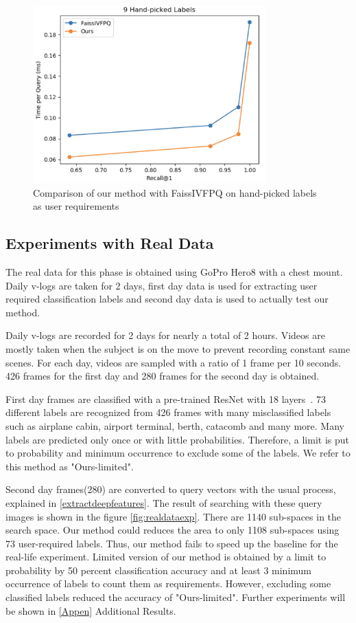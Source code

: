 \begin{figure}
    \centering
    \includegraphics[width=0.8\textwidth]{thesis/images/9_handpicked.png}
    \caption{Comparison of our method with FaissIVFPQ on hand-picked labels as user requirements}
    \label{fig:handpickedexp}
\end{figure}

\subsection*{Experiments with Real Data}

The real data for this phase is obtained using GoPro Hero8 with a chest mount. 
Daily v-logs are taken for 2 days, first day data is used for extracting user required classification labels and second day data is used to actually test our method.

Daily v-logs are recorded for 2 days for nearly a total of 2 hours. 
Videos are mostly taken when the subject is on the move to prevent recording constant same scenes.
For each day, videos are sampled with a ratio of 1 frame per 10 seconds. 
426 frames for the first day and 280 frames for the second day is obtained.

First day frames are classified with a pre-trained ResNet with 18 layers~\cite{resnet}. 
73 different labels are recognized from 426 frames with many misclassified labels such as airplane cabin, airport terminal, berth, catacomb and many more. 
Many labels are predicted only once or with little probabilities. Therefore, a limit is put to probability and minimum occurrence to exclude some of the labels. 
We refer to this method as "Ours-limited".

Second day frames(280) are converted to query vectors with the usual process, explained in \ref{extractdeepfeatures}. The result of searching with these query images is shown in the figure \ref{fig:realdataexp}. 
There are 1140 sub-spaces in the search space. Our method could reduces the area to only 1108 sub-spaces using 73 user-required labels. 
Thus, our method fails to speed up the baseline for the real-life experiment. 
Limited version of our method is obtained by a limit to probability by 50 percent classification accuracy and at least 3 minimum occurrence of labels to count them as requirements.
However, excluding some classified labels reduced the accuracy of "Ours-limited".
Further experiments will be shown in \ref{Appen} Additional Results.

